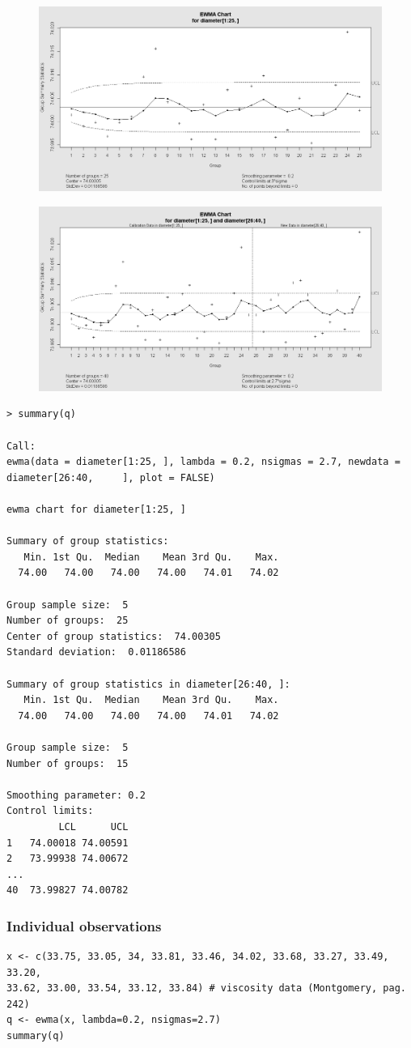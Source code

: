 \documentclass[a4paper,12pt]{article}
\begin{document}
\begin{figure}[h!]
\centering
\includegraphics[width=0.6\linewidth]{./qccEWMA1}
\caption{}
\label{fig:qccEWMA1}
\end{figure}
\begin{figure}[h!]
\centering
\includegraphics[width=0.6\linewidth]{./qccEWMA2}
\caption{}
\label{fig:qccEWMA2}
\end{figure}
\begin{verbatim}
> summary(q)

Call:
ewma(data = diameter[1:25, ], lambda = 0.2, nsigmas = 2.7, newdata = diameter[26:40,     ], plot = FALSE)

ewma chart for diameter[1:25, ] 

Summary of group statistics:
   Min. 1st Qu.  Median    Mean 3rd Qu.    Max. 
  74.00   74.00   74.00   74.00   74.01   74.02 

Group sample size:  5
Number of groups:  25
Center of group statistics:  74.00305
Standard deviation:  0.01186586 

Summary of group statistics in diameter[26:40, ]:
   Min. 1st Qu.  Median    Mean 3rd Qu.    Max. 
  74.00   74.00   74.00   74.00   74.01   74.02 

Group sample size:  5
Number of groups:  15 

Smoothing parameter: 0.2 
Control limits:
         LCL      UCL
1   74.00018 74.00591
2   73.99938 74.00672
...                  
40  73.99827 74.00782

\end{verbatim}
\newpage
\subsubsection{Individual observations}
\begin{framed}
\begin{verbatim}
x <- c(33.75, 33.05, 34, 33.81, 33.46, 34.02, 33.68, 33.27, 33.49, 33.20,
33.62, 33.00, 33.54, 33.12, 33.84) # viscosity data (Montgomery, pag. 242)
q <- ewma(x, lambda=0.2, nsigmas=2.7)
summary(q)
\end{verbatim}
\end{framed}
\end{document}
